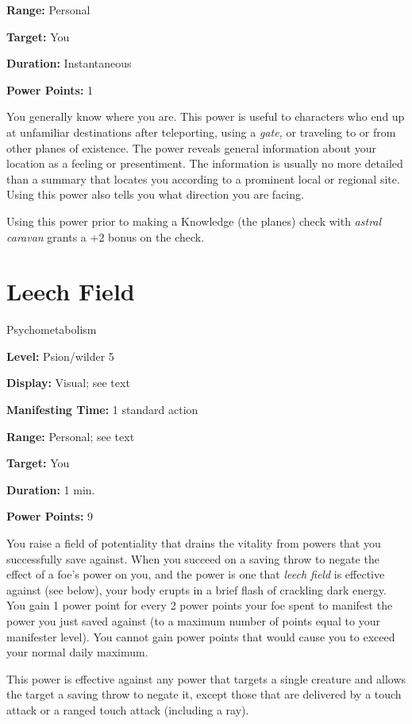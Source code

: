 \documentclass{article}
\begin{document}
\textbf{Range:} Personal

\textbf{Target:} You

\textbf{Duration:} Instantaneous

\textbf{Power Points:} 1

You generally know where you are. This power is useful to characters who end up 
at unfamiliar destinations after teleporting, using a \textit{gate, }or traveling 
to or from other planes of existence. The power reveals general information about 
your location as a feeling or presentiment. The information is usually no more 
detailed than a summary that locates you according to a prominent local or regional 
site. Using this power also tells you what direction you are facing.

Using this power prior to making a Knowledge (the planes) check with \textit{astral 
caravan }grants a +2 bonus on the check.

\vspace{12pt}
\section*{Leech Field}

Psychometabolism

\textbf{Level:} Psion/wilder 5

\textbf{Display:} Visual; see text

\textbf{Manifesting Time:} 1 standard action

\textbf{Range:} Personal; see text

\textbf{Target:} You

\textbf{Duration:} 1 min.

\textbf{Power Points:} 9

You raise a field of potentiality that drains the vitality from powers that you 
successfully save against. When you succeed on a saving throw to negate the effect 
of a foe's power on you, and the power is one that \textit{leech field }is effective 
against (see below), your body erupts in a brief flash of crackling dark energy. 
You gain 1 power point for every 2 power points your foe spent to manifest the 
power you just saved against (to a maximum number of points equal to your manifester 
level). You cannot gain power points that would cause you to exceed your normal 
daily maximum.

This power is effective against any power that targets a single creature and allows 
the target a saving throw to negate it, except those that are delivered by a touch 
attack or a ranged touch attack (including a ray).
\end{document}
